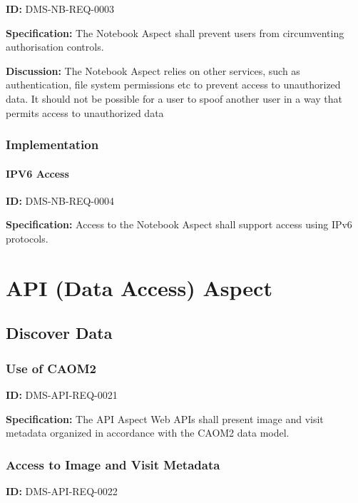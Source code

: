 \documentclass[SE,toc]{lsstdoc}
\begin{document}
\label{DMS-NB-REQ-0003}
\textbf{ID:} DMS-NB-REQ-0003

\textbf{Specification:}
The Notebook Aspect shall prevent users from circumventing authorisation controls.

\textbf{Discussion:}
The Notebook Aspect relies on other services, such as authentication, file system permissions etc to prevent access to unauthorized data. It should not be possible for a user to spoof another user in a way that permits access to unauthorized data

\subsubsection{Implementation}

\paragraph{IPV6 Access}\hfill  %

\label{DMS-NB-REQ-0004}
\textbf{ID:} DMS-NB-REQ-0004

\textbf{Specification:}
Access to the Notebook Aspect shall support access using IPv6 protocols.

\section{API (Data Access) Aspect}

\subsection{Discover Data}

\subsubsection{Use of CAOM2}

\label{DMS-API-REQ-0021}
\textbf{ID:} DMS-API-REQ-0021

\textbf{Specification:}
The API Aspect Web APIs shall present image and visit metadata organized in accordance with the CAOM2 data model.

\subsubsection{Access to Image and Visit Metadata}

\label{DMS-API-REQ-0022}
\textbf{ID:} DMS-API-REQ-0022
\end{document}
